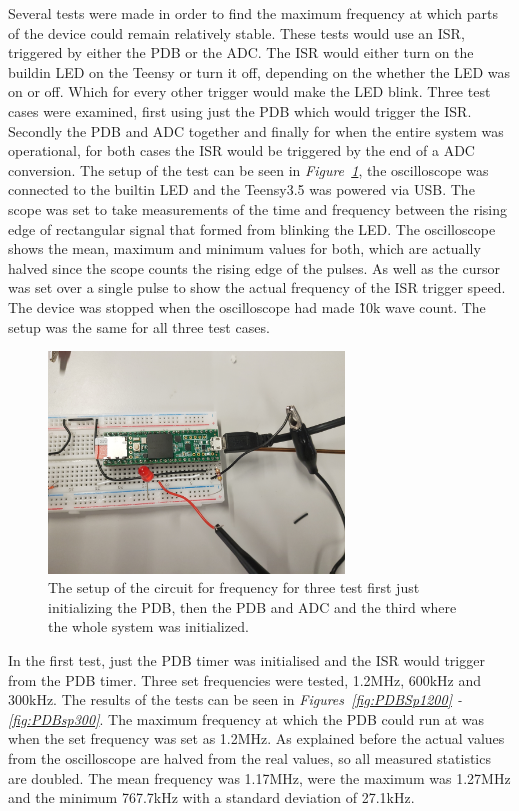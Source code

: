 Several tests were made in order to find the maximum frequency at which parts of the device could remain relatively stable.
These tests would use an ISR, triggered by either the PDB or the ADC.
The ISR would either turn on the buildin LED on the Teensy or turn it off, depending on the whether the LED was on or off.
Which for every other trigger would make the LED blink.
Three test cases were examined, first using just the PDB which would trigger the ISR. 
Secondly the PDB and ADC together and finally for when the entire system was operational, for both cases the ISR would be triggered by the end of a ADC conversion.
The setup of the test can be seen in \textit{Figure~\ref{fig:SetupCircSpeed}}, the oscilloscope was connected to the builtin LED and the Teensy3.5 was powered via USB.
The scope was set to take measurements of the time and frequency between the rising edge of rectangular signal that formed from blinking the LED. 
The oscilloscope shows the mean, maximum and minimum values for both, which are actually halved since the scope counts the rising edge of the pulses.
As well as the cursor was set over a single pulse to show the actual frequency of the ISR trigger speed.
The device was stopped when the oscilloscope had made \~10k wave count.
The setup was the same for all three test cases.


\begin{figure}[h]
    \centering
    \includegraphics[width=0.7\textwidth]{graphics/SetupCircSpeed.jpg}
    \caption{The setup of the circuit for frequency for three test first just initializing the PDB, then the PDB and ADC and the third where the whole system was initialized.}
    \label{fig:SetupCircSpeed}
\end{figure}

In the first test, just the PDB timer was initialised and the ISR would trigger from the PDB timer.
Three set frequencies were tested, 1.2MHz, 600kHz and 300kHz.
The results of the tests can be seen in \textit{Figures~\ref{fig:PDBSp1200} - \ref{fig:PDBsp300}}.
The maximum frequency at which the PDB could run at was when the set frequency was set as 1.2MHz.
As explained before the actual values from the oscilloscope are halved from the real values, so all measured statistics are doubled.
The mean frequency was 1.17MHz, were the maximum was 1.27MHz and the minimum 767.7kHz with a standard deviation of 27.1kHz. 

